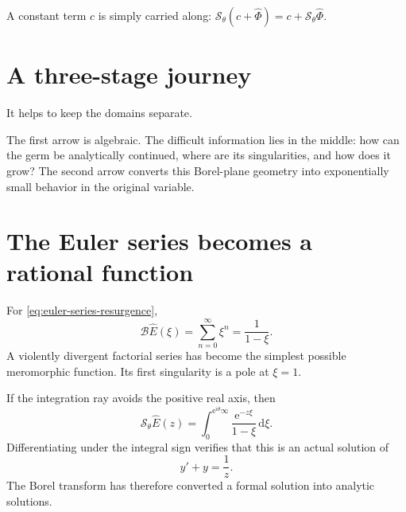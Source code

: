 \documentclass[11pt,oneside]{book}
\theoremstyle{definition}
\theoremstyle{remark}
\newcommand{\Borel}{\mathcal{B}}
\newcommand{\Laplace}{\mathcal{L}}
\newcommand{\e}{\mathrm{e}}
\newcommand{\dd}{\,\mathrm{d}}
\newcommand{\phihat}{\widehat{\Phi}}
\begin{document}
A constant term $c$ is simply carried along:
$\mathcal S_\theta(c+\phihat)=c+\mathcal S_\theta\phihat$.

\section{A three-stage journey}

It helps to keep the domains separate.

\begin{center}
\end{center}

The first arrow is algebraic. The difficult information lies in the middle:
how can the germ be analytically continued, where are its singularities, and
how does it grow? The second arrow converts this Borel-plane geometry into
exponentially small behavior in the original variable.

\section{The Euler series becomes a rational function}

For \eqref{eq:euler-series-resurgence},
\begin{equation}
  \Borel\widehat E(\xi)
   =\sum_{n=0}^{\infty}\xi^n
   =\frac1{1-\xi}.
  \label{eq:euler-borel-transform}
\end{equation}
A violently divergent factorial series has become the simplest possible
meromorphic function. Its first singularity is a pole at $\xi=1$.

If the integration ray avoids the positive real axis, then
\begin{equation}
  \mathcal S_\theta\widehat E(z)
  =\int_{0}^{\e^{i\theta}\infty}
       \frac{\e^{-z\xi}}{1-\xi}\dd\xi.
  \label{eq:euler-directional-sum}
\end{equation}
Differentiating under the integral sign verifies that this is an actual solution
of
\[
  y'+y=\frac1z.
\]
The Borel transform has therefore converted a formal solution into analytic
solutions.
\end{document}
